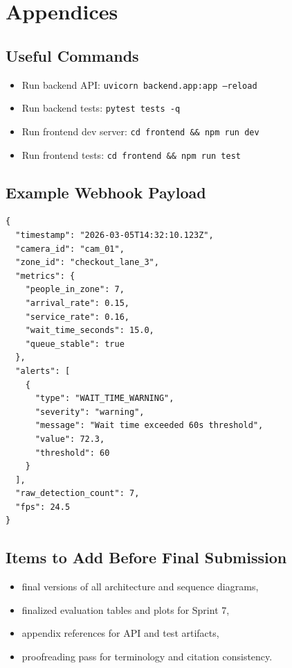 \chapter{Appendices}

\section{Useful Commands}
\begin{itemize}
  \item Run backend API: \texttt{uvicorn backend.app:app --reload}
  \item Run backend tests: \texttt{pytest tests -q}
  \item Run frontend dev server: \texttt{cd frontend \&\& npm run dev}
  \item Run frontend tests: \texttt{cd frontend \&\& npm run test}
\end{itemize}

\section{Example Webhook Payload}
\begin{verbatim}
{
  "timestamp": "2026-03-05T14:32:10.123Z",
  "camera_id": "cam_01",
  "zone_id": "checkout_lane_3",
  "metrics": {
    "people_in_zone": 7,
    "arrival_rate": 0.15,
    "service_rate": 0.16,
    "wait_time_seconds": 15.0,
    "queue_stable": true
  },
  "alerts": [
    {
      "type": "WAIT_TIME_WARNING",
      "severity": "warning",
      "message": "Wait time exceeded 60s threshold",
      "value": 72.3,
      "threshold": 60
    }
  ],
  "raw_detection_count": 7,
  "fps": 24.5
}
\end{verbatim}

\section{Items to Add Before Final Submission}
\begin{itemize}
  \item final versions of all architecture and sequence diagrams,
  \item finalized evaluation tables and plots for Sprint 7,
  \item appendix references for API and test artifacts,
  \item proofreading pass for terminology and citation consistency.
\end{itemize}
